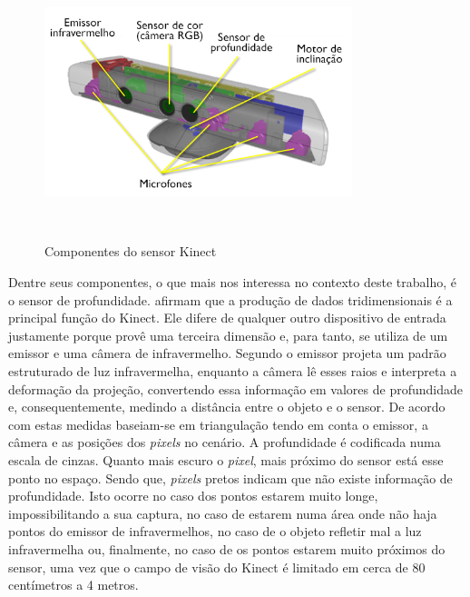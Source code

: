 \begin{figure}[H]
  \begin{center}
    \caption{Componentes do sensor Kinect}
    \vspace*{0,2cm}
    \includegraphics[width=0.8\textwidth]{./04-figuras/kinect_componentes}
    \label{fig:kinect_componentes}
  \end{center}
  \vspace*{-0,5cm}
  \\
\end{figure}

Dentre seus componentes, o que mais nos interessa no contexto deste trabalho, é o sensor de profundidade.  afirmam que a produção de dados tridimensionais é a principal função do Kinect. Ele difere de qualquer outro dispositivo de entrada justamente porque provê uma terceira dimensão e, para tanto, se utiliza de um emissor e uma câmera de infravermelho. Segundo  o emissor projeta um padrão estruturado de luz infravermelha, enquanto a câmera lê esses raios e interpreta a deformação da projeção, convertendo essa informação em valores de profundidade e, consequentemente, medindo a distância entre o objeto e o sensor. De acordo com  estas medidas baseiam-se em triangulação tendo em conta o emissor, a câmera e as posições dos \textit{pixels} no cenário. A profundidade é codificada numa escala de cinzas. Quanto mais escuro o \textit{pixel}, mais próximo do sensor está esse ponto no espaço. Sendo que, \textit{pixels} pretos indicam que não existe informação de profundidade. Isto ocorre no caso dos pontos estarem muito longe, impossibilitando a sua captura, no caso de estarem numa área onde não haja pontos do emissor de infravermelhos, no caso de o objeto refletir mal a luz infravermelha ou, finalmente, no caso de os pontos estarem muito próximos do sensor, uma vez que o campo de visão do Kinect é limitado em cerca de 80 centímetros a 4 metros.

